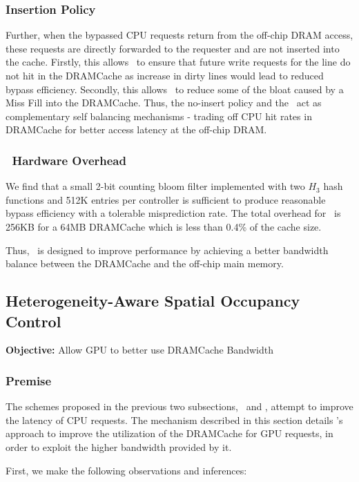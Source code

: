 \subsubsection{Insertion Policy}
\par Further, when the bypassed CPU requests return from the off-chip DRAM access, these requests are directly forwarded to the requester and are not inserted into the cache. 
Firstly, this allows \bypassname\ to ensure that future write requests for the line do not hit in the DRAMCache as increase in dirty lines would lead to reduced bypass efficiency. 
Secondly, this allows \bypassname\ to reduce some of the bloat caused by a Miss Fill \cite{bear} into the DRAMCache.
Thus, the no-insert policy and the \bypassname\ act as complementary self balancing mechanisms - trading off CPU hit rates in DRAMCache for better access latency at the off-chip DRAM.
\subsubsection{\bypassname\ Hardware Overhead}
\par We find that a small 2-bit counting bloom filter implemented with two $H_3$ hash functions \cite{h3} and 512K entries per controller is sufficient 
to produce reasonable bypass efficiency with a tolerable misprediction rate. The total overhead for \bypassname\ is 256KB for a 64MB DRAMCache which is less than 0.4\% of the cache size.
\par Thus, \bypassname\ is designed to improve performance by achieving a better bandwidth balance between the DRAMCache and the off-chip main memory.


\subsection{Heterogeneity-Aware Spatial Occupancy Control} \label{mechanism-chaining}
\textbf{Objective:} Allow GPU to better use DRAMCache Bandwidth
\subsubsection{Premise}
The schemes proposed in the previous two subsections, \prioname\ and \bypassname, attempt to improve the latency of CPU requests. The mechanism described in this section details \cachename's approach to improve the utilization of the DRAMCache for GPU requests, in order to exploit the higher bandwidth provided by it. 
\par First, we make the following observations and inferences: 

